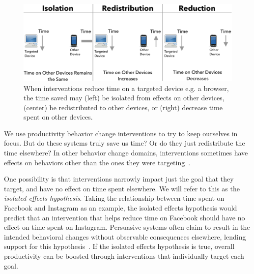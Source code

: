 \begin{figure}[tb]

\includegraphics[width=\linewidth]{figures2/intro/fig2v5.pdf}
\caption{When interventions reduce time on a targeted device e.g. a browser, the time saved may (left) be isolated from effects on other devices, (center) be redistributed to other devices, or (right) decrease time spent on other devices.} %
  \label{fig:hypotheses-across}
\end{figure}

We use productivity behavior change interventions to try to keep ourselves in focus. But do these systems truly save us time? Or do they just redistribute the time elsewhere? In other behavior change domains, interventions sometimes have effects on behaviors other than the ones they were targeting~\cite{stamford1986effects, COTTER2014243}. %

One possibility is that interventions narrowly impact just the goal that they target, and have no effect on time spent elsewhere. We will refer to this as the \textit{isolated effects hypothesis}. Taking the relationship between time spent on Facebook and Instagram as an example, the isolated effects hypothesis would predict that an intervention that helps reduce time on Facebook should have no effect on time spent on Instagram. Persuasive systems often claim to result in the intended behavioral changes without observable consequences elsewhere, lending support for this hypothesis~\cite{doi:10.1080/15228830802094429,cugelman2013gamification, lyons2014behavior,anderson2013steering, anderson2014engaging}. If the isolated effects hypothesis is true, overall productivity can be boosted through interventions that individually target each goal. %

